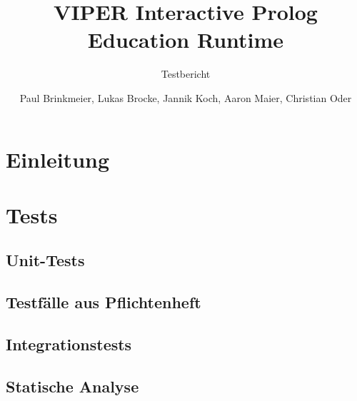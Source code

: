 \documentclass[parskip=full,11pt,twoside]{scrartcl}
\title{VIPER Interactive Prolog Education Runtime}
\subtitle{Testbericht}
\author{Paul Brinkmeier, Lukas Brocke, Jannik Koch, Aaron Maier, Christian Oder}
\date{}
\begin{document}
\maketitle

\tableofcontents

\section{Einleitung}
\setcounter{page}{1}




\section{Tests}

\subsection{Unit-Tests}



\subsection{Testfälle aus Pflichtenheft}

\subsection{Integrationstests}

\subsection{Statische Analyse}


\end{document}

